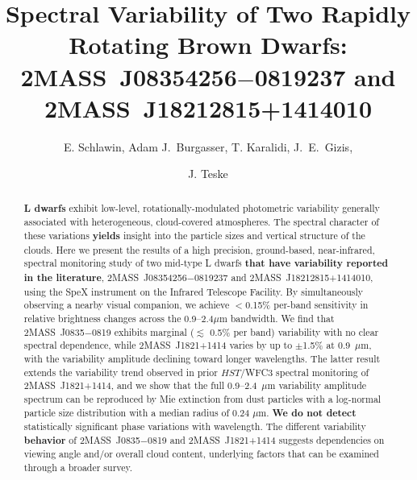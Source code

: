 \documentclass[twocolumn]{aastex6}
\begin{document}
\title{Spectral Variability of Two Rapidly Rotating Brown Dwarfs: \\2MASS~J08354256$-$0819237 and 2MASS~J18212815+1414010}


\author{E. Schlawin, Adam J.\ Burgasser, T. Karalidi, J.\ E.\  Gizis,  \and J. Teske}


\begin{abstract}
\textbf{L dwarfs} exhibit low-level, rotationally-modulated photometric variability generally associated with heterogeneous, cloud-covered atmospheres. The spectral character of these variations \textbf{yields} insight into the particle sizes and vertical structure of the clouds. Here we present the results of a high precision, ground-based, near-infrared, spectral monitoring study of two mid-type L dwarfs \textbf{that have variability reported in the literature}, 2MASS~J08354256$-$0819237 and 2MASS~J18212815+1414010, using the SpeX instrument on the Infrared Telescope Facility. By simultaneously observing a nearby visual companion, we achieve $<$0.15\% per-band sensitivity in relative brightness changes across the 0.9--2.4$\mu$m bandwidth. We find that 2MASS~J0835$-$0819 exhibits marginal ($\lesssim$ 0.5\% per band) variability with no clear spectral dependence, while 2MASS~J1821+1414 varies by up to $\pm$1.5\% at 0.9~$\mu$m, with the variability amplitude declining toward longer wavelengths. The latter result extends the variability trend observed in prior $HST$/WFC3 spectral monitoring of 2MASS~J1821+1414, and we show that the full 0.9--2.4~$\mu$m variability amplitude spectrum can be reproduced by Mie extinction from dust particles with a log-normal particle size distribution with a median radius of 0.24 $\mu$m. \textbf{We do not detect} statistically significant phase variations with wavelength. The different variability \textbf{behavior} of 2MASS~J0835$-$0819 and  2MASS~J1821+1414 suggests dependencies on viewing angle and/or overall cloud content, underlying factors that can be examined through a broader survey.
\end{abstract}
\end{document}
